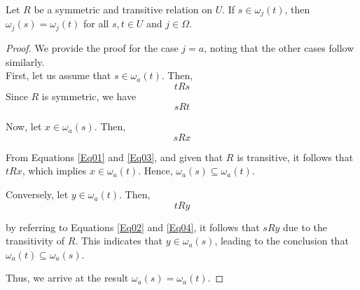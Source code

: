 \documentclass[10pt,a4paper]{amsart}
\begin{document}
\begin{lemma} \label{l1} Let $R$ be a symmetric and transitive relation on $U$. If $s \in \omega_{j}(t)$, then $\omega_{j}(s) = \omega_{j}(t)$ for all $s, t \in U$ and $j \in \Omega$.
\end{lemma}

\begin{proof}
We provide the proof for the case $j = a$, noting that the other cases follow similarly. \\

First, let us assume that $s \in \omega_{a}(t)$. Then,
\begin{equation}  \label{Eq01}
tRs
\end{equation}
Since $R$ is symmetric, we have
\begin{equation}  \label{Eq02}
sRt
\end{equation}

Now, let $x \in \omega_{a}(s)$. Then,
\begin{equation}  \label{Eq03}
sRx
\end{equation}

From Equations \ref{Eq01} and \ref{Eq03}, and given that $R$ is transitive, it follows that $tRx$, which implies $x \in \omega_{a}(t)$. Hence, $\omega_{a}(s) \subseteq \omega_{a}(t)$.

Conversely, let $y \in \omega_{a}(t)$. Then,
\begin{equation}  \label{Eq04}
tRy
\end{equation}

by referring to Equations \ref{Eq02} and \ref{Eq04}, it follows that $sRy$ due to the transitivity of $R$.
This indicates that $y \in \omega_{a}(s)$, leading to the conclusion that $\omega_{a}(t) \subseteq \omega_{a}(s)$.

Thus, we arrive at the result $\omega_{a}(s) = \omega_{a}(t)$.
\end{proof}
\end{document}
